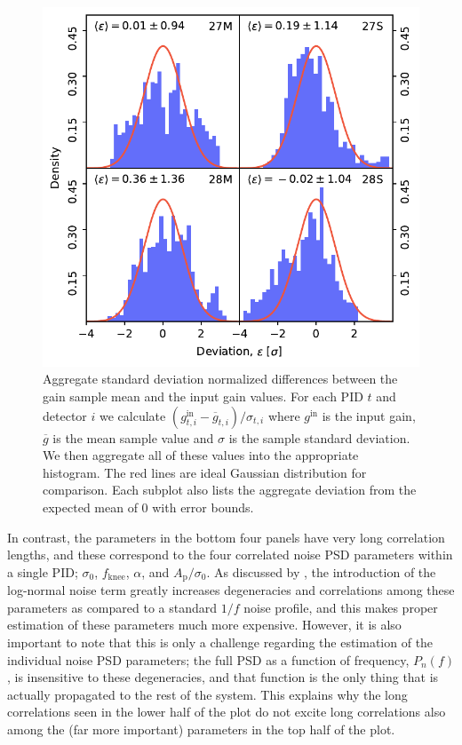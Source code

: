 \documentclass[twocolumn]{aa}%
\begin{document}
\begin{figure}[t]
    \begin{center}
        \includegraphics[width=\linewidth]{figs/simagghist_gain.pdf}
        \caption{Aggregate standard deviation normalized differences between the gain sample mean and the input gain values. For each PID $t$ and detector $i$ we calculate $(g^{\mathrm{in}}_{t, i} - \overline{g}_{t, i}) / \sigma_{t, i}$ where $g^{\mathrm{in}}$ is the input gain, $\overline{g}$ is the mean sample value and $\sigma$ is the sample standard deviation. We then aggregate all of these values into the appropriate histogram. The red lines are ideal Gaussian distribution for comparison. Each subplot also lists the aggregate deviation from the expected mean of 0 with error bounds.}
        \label{fig:agghist_gain}

    \end{center}
\end{figure}



In contrast, the parameters in the bottom four panels have very long
correlation lengths, and these correspond to the four correlated noise
PSD parameters within a single PID; $\sigma_0$, $f_{\mathrm{knee}}$,
$\alpha$, and $A_\mathrm{p}/\sigma_0$. As discussed by \citet{bp06},
the introduction of the log-normal noise term greatly increases
degeneracies and correlations among these parameters as compared to a
standard $1/f$ noise profile, and this makes proper estimation of
these parameters much more expensive. However, it is also important to
note that this is only a challenge regarding the estimation of the individual
noise PSD parameters; the full PSD as a function of frequency,
$P_{n}(f)$, is insensitive to these degeneracies, and that function is the only thing that is actually propagated to the rest of the system. This
explains why the long correlations seen in the lower half of the plot
do not excite long correlations also among the (far more important)
parameters in the top half of the plot.
\end{document}

